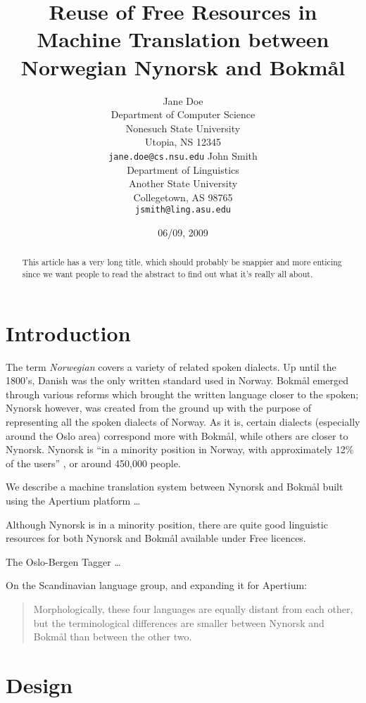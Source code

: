 \documentclass[11pt]{article}
\author{Jane Doe\\  Department of Computer Science \\  Nonesuch State University \\  Utopia, NS 12345 \\  {\tt jane.doe@cs.nsu.edu} \And  John Smith \\  Department of Linguistics \\  Another State University \\  Collegetown, AS 98765 \\    {\tt jsmith@ling.asu.edu}}
\title{Reuse of Free Resources in Machine Translation between Norwegian Nynorsk and Bokmål}
\date{06/09, 2009}
\begin{document}
\maketitle


\begin{abstract}

  This article has a very long title, which should probably be snappier and more enticing since we want people to read the abstract to find out what it's really all about.
\end{abstract}

\section{Introduction}
\label{sec-1}

The term \emph{Norwegian} covers a variety of related spoken dialects. Up
until the 1800's, Danish was the only written standard used in
Norway. Bokmål emerged through various reforms which brought the
written language closer to the spoken; Nynorsk however, was created
from the ground up with the purpose of representing all the spoken
dialects of Norway. As it is, certain dialects (especially around the
Oslo area) correspond more with Bokmål, while others are closer to
Nynorsk. Nynorsk is ``in a minority position in Norway, with
approximately 12\% of the users'' \citep{everson2000sln}, or around
450,000 people. 

We describe a machine translation system between Nynorsk and Bokmål
built using the Apertium platform \citep{corbi05oss}\ldots{}

Although Nynorsk is in a minority position, there are quite good
linguistic resources for both Nynorsk and Bokmål available under Free
licences.

The Oslo-Bergen Tagger \citep{hagen2000cbt} \ldots{}


On the Scandinavian language group, and expanding it for Apertium:
\begin{quote}
Morphologically, these four languages are equally distant from each
other, but the terminological differences are smaller between Nynorsk
and Bokmål than between the other two. \\
\citep{everson2000sln}
\end{quote}






\section{Design}
\label{sec-2}
\end{document}
